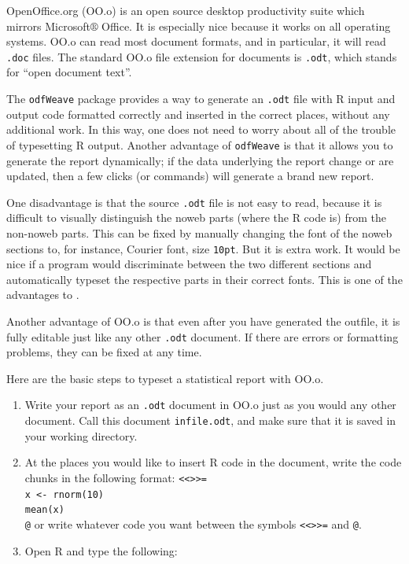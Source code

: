 \documentclass[captions=tableheading]{scrbook}
\begin{document}
OpenOffice.org (OO.o) is an open source desktop productivity suite which mirrors Microsoft\(\circledR\) Office. It is especially nice because it works on all operating systems. OO.o can read most document formats, and in particular, it will read \texttt{.doc} files. The standard OO.o file extension for documents is \texttt{.odt}, which stands for ``open document text''.

The \texttt{odfWeave}  package \cite{odfweave} provides a way to generate an \texttt{.odt} file with \textsf{R} input and output code formatted correctly and inserted in the correct places, without any additional work. In this way, one does not need to worry about all of the trouble of typesetting \textsf{R} output. Another advantage of \texttt{odfWeave} is that it allows you to generate the report dynamically; if the data underlying the report change or are updated, then a few clicks (or commands) will generate a brand new report.

One disadvantage is that the source \texttt{.odt}  file is not easy to read, because it is difficult to visually distinguish the noweb parts (where the \textsf{R} code is) from the non-noweb parts. This can be fixed by manually changing the font of the noweb sections to, for instance, Courier font, size \texttt{10pt}. But it is extra work. It would be nice if a program would discriminate between the two different sections and automatically typeset the respective parts in their correct fonts. This is one of the advantages to \LyX{}.

Another advantage of OO.o is that even after you have generated the outfile, it is fully editable just like any other \texttt{.odt} document. If there are errors or formatting problems, they can be fixed at any time.

Here are the basic steps to typeset a statistical report with OO.o.

\begin{enumerate}
\item Write your report as an \texttt{.odt} document in OO.o just as you would any other document. Call this document \texttt{infile.odt}, and make sure that it is saved in your working directory.
\item At the places you would like to insert \textsf{R} code in the document, write the code chunks in the following format:
   \texttt{<\textcompwordmark{}<>\textcompwordmark{}>=}~\\
   \texttt{x <- rnorm(10)}~\\
   \texttt{mean(x)}~\\
   \texttt{@}
   or write whatever code you want between the symbols \texttt{<\textcompwordmark{}<>\textcompwordmark{}>=} and \texttt{@}.
\item Open \textsf{R} and type the following:
\end{enumerate}
\end{document}

